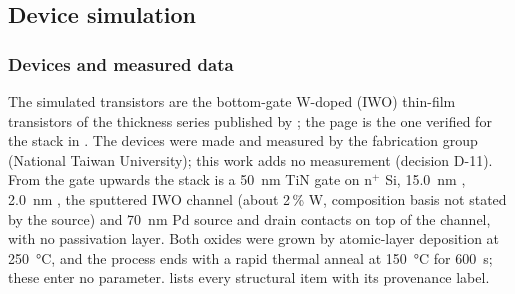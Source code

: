 \subsection{Device simulation}
\label{sec:m-tcad}

\subsubsection{Devices and measured data}
\label{sec:m-tcad-data}

The simulated transistors are the bottom-gate W-doped \InO{} (IWO) thin-film transistors of the thickness series
published by \citet[pp.~2--3]{Januar2026}; the page is the one verified for the stack in
. %
The devices were made and measured by the fabrication group (National Taiwan University); this work adds no
measurement (decision D-11). %
From the gate upwards the stack is a \SI{50}{nm} TiN gate on n$^+$ Si, \SI{15.0}{nm} \HfO{}, \SI{2.0}{nm} \AlO{}, the
sputtered IWO channel (about 2\,\% W, composition basis not stated by the source) and \SI{70}{nm} Pd source and drain
contacts on top of the channel, with no passivation layer. %
Both oxides were grown by atomic-layer deposition at \SI{250}{\celsius}, and the process ends with a rapid thermal
anneal at \SI{150}{\celsius} for \SI{600}{s}; these enter no parameter. %
 lists every structural item with its provenance label.


